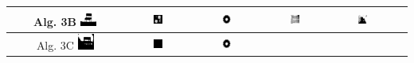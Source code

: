 \documentclass[main]{subfiles}
\begin{document}
\begin{table}
\centering
\begin{tabular}{cccccc}\hline
Alg. 3B\quad
\includegraphics[width=0.15\textwidth]{img/res/e3a/alg3btipo-chair.jpg} &
\includegraphics[width=0.15\textwidth]{img/res/e3a/alg3btipo-block.jpg} &
\includegraphics[width=0.15\textwidth]{img/res/e3a/alg3btipo-02.jpg} &
\includegraphics[width=0.15\textwidth]{img/res/e3a/alg3btipo-09.jpg} &
\includegraphics[width=0.15\textwidth]{img/res/e3a/alg3btipo-07.jpg}\\\hline
Alg. 3C\quad
\includegraphics[width=0.15\textwidth]{img/res/e3a/alg3ctipo-chair.jpg} &
\includegraphics[width=0.15\textwidth]{img/res/e3a/alg3ctipo-block.jpg} &
\includegraphics[width=0.15\textwidth]{img/res/e3a/alg3btipo-02.jpg} &

\end{tabular}
\end{table}
\end{document}
